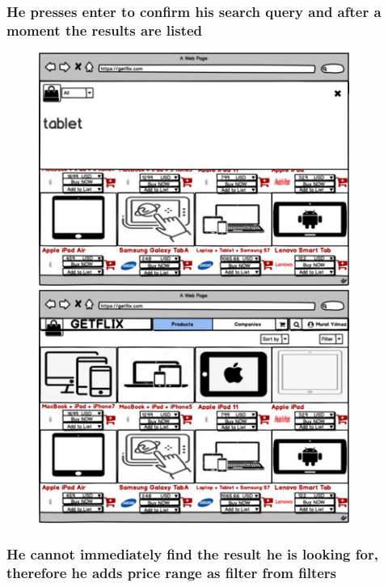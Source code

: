 \documentclass[]{article}
\begin{document}
\hypertarget{he-presses-enter-to-confirm-his-search-query-and-after-a-moment-the-results-are-listed}{%
    \subsubsection{He presses enter to confirm his search query and after a
        moment the results are
        listed}\label{he-presses-enter-to-confirm-his-search-query-and-after-a-moment-the-results-are-listed}}

\begin{figure}[H]
    \centering
    \includegraphics[height=3in]{./images/39.jpg}
    \includegraphics[height=3in]{./images/40.jpg}
\end{figure}


\hypertarget{he-cannot-immediately-find-the-result-he-is-looking-for-therefore-he-adds-price-range-as-filter-from-filters}{%
    \subsubsection{He cannot immediately find the result he is looking for,
        therefore he adds price range as filter from
        filters}\label{he-cannot-immediately-find-the-result-he-is-looking-for-therefore-he-adds-price-range-as-filter-from-filters}}
\end{document}
